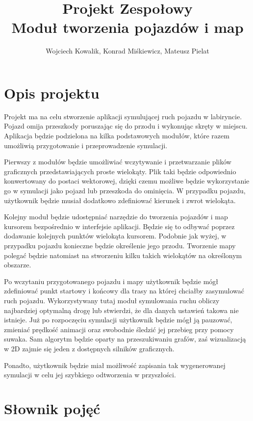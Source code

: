 \documentclass{article}
\let\oldsection\section
\renewcommand\section{\clearpage\oldsection} %
\begin{document}
\title{\textbf{Projekt Zespołowy}\\Moduł tworzenia pojazdów i map}
\author{Wojciech Kowalik, Konrad Miśkiewicz, Mateusz Pielat}
\maketitle


\section{Opis projektu}

Projekt ma na celu stworzenie aplikacji symulującej ruch pojazdu w labiryncie. Pojazd omija przeszkody poruszając się do przodu i wykonując skręty w miejscu. Aplikacja będzie podzielona na kilka podstawowych modułów, które razem umożliwią przygotowanie i przeprowadzenie symulacji.

Pierwszy z modułów będzie umożliwiać wczytywanie i przetwarzanie plików graficznych przedstawiających proste wielokąty. Plik taki będzie odpowiednio konwertowany do postaci wektorowej, dzięki czemu możliwe będzie wykorzystanie go w symulacji jako pojazd lub przeszkoda do ominięcia. W przypadku pojazdu, użytkownik będzie musiał dodatkowo zdefiniować kierunek i zwrot wielokąta.

Kolejny moduł będzie udostępniać narzędzie do tworzenia pojazdów i map kursorem bezpośrednio w interfejsie aplikacji. Będzie się to odbywać poprzez dodawanie kolejnych punktów wielokąta kursorem. Podobnie jak wyżej, w przypadku pojazdu konieczne będzie określenie jego przodu. Tworzenie mapy polegać będzie natomiast na stworzeniu kilku takich wielokątów na określonym obszarze.

Po wczytaniu przygotowanego pojazdu i mapy użytkownik będzie mógł zdefiniować punkt startowy i końcowy dla trasy na której chciałby zasymulować ruch pojazdu. Wykorzystywany tutaj moduł symulowania ruchu obliczy najbardziej optymalną drogę lub stwierdzi, że dla danych ustawień takowa nie istnieje. Już po rozpoczęciu symulacji użytkownik będzie mógł ją pauzować, zmieniać prędkość animacji oraz swobodnie śledzić jej przebieg przy pomocy suwaka. Sam algorytm będzie oparty na przeszukiwaniu grafów, zaś wizualizacją w 2D zajmie się jeden z dostępnych silników graficznych.

Ponadto, użytkownik będzie miał możliwość zapisania tak wygenerowanej symulacji w celu jej szybkiego odtworzenia w przyszłości.



\section{Słownik pojęć}
\end{document}
